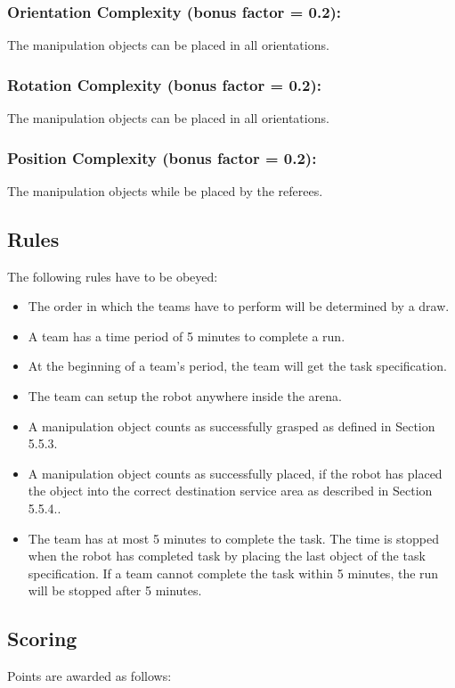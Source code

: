 \subsubsection{Orientation Complexity (bonus factor = 0.2):}
The manipulation objects can be placed in all orientations.

\subsubsection{Rotation Complexity (bonus factor = 0.2):}
The manipulation objects can be placed in all orientations.

\subsubsection{Position Complexity (bonus factor = 0.2):}
The manipulation objects while be placed by the referees.

\subsection{Rules}
The following rules have to be obeyed:

\begin{itemize}
\item The order in which the teams have to perform will be determined by a draw.
\item A team has a time period of 5 minutes to complete a run.
\item At the beginning of a team’s period, the team will get the task specification. 
\item The team can setup the robot anywhere inside the arena.
\item A manipulation object counts as successfully grasped as defined in Section 5.5.3.
\item A manipulation object counts as successfully placed, if the robot has placed the object into the correct destination service area as described in Section 5.5.4.. 
\item The team has at most 5 minutes to complete the task. The time is stopped when the robot has completed task by placing the last object of the task specification. If a team cannot complete the task within 5 minutes, the run will be stopped after 5 minutes. 
\end{itemize}


\subsection{Scoring}
Points are awarded as follows:


